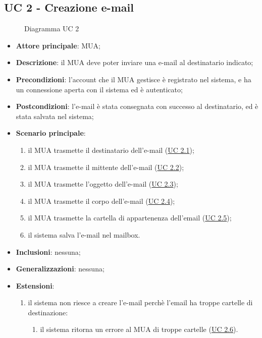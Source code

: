 
\subsection{UC 2 - Creazione e-mail} \label{sec:UC2}
    \begin{figure}[h]
        \centering
        \caption{Diagramma UC 2}
    \end{figure}
    \begin{itemize}
        \item \textbf{Attore principale}: MUA;
        \item \textbf{Descrizione}: il MUA deve poter inviare una e-mail al destinatario indicato;
        \item \textbf{Precondizioni}: l’account che il MUA gestisce è registrato nel sistema, e ha un connessione aperta con il sistema ed è autenticato;
        \item \textbf{Postcondizioni}: l'e-mail è stata consegnata con successo al destinatario, ed è stata salvata nel sistema;
        \item \textbf{Scenario principale}:
            \begin{enumerate}
                \item il MUA trasmette il destinatario dell'e-mail (\hyperref[sec:UC2.1]{UC 2.1});
                \item il MUA trasmette il mittente dell'e-mail (\hyperref[sec:UC2.2]{UC 2.2});
                \item il MUA trasmette l'oggetto dell'e-mail (\hyperref[sec:UC2.3]{UC 2.3});
                \item il MUA trasmette il corpo dell'e-mail (\hyperref[sec:UC2.4]{UC 2.4});
                \item il MUA trasmette la cartella di appartenenza dell'email (\hyperref[sec:UC2.5]{UC 2.5});
                \item il sistema salva l'e-mail nel mailbox.
            \end{enumerate}
        \item \textbf{Inclusioni}: nessuna;
        \item \textbf{Generalizzazioni}: nessuna;
        \item \textbf{Estensioni}: 
            \begin{enumerate}[label=\alph*.]
                \item il sistema non riesce a creare l'e-mail perchè l'email ha troppe cartelle di destinazione:
                \begin{enumerate}[label=\arabic*.]
                    \item il sistema ritorna un errore al MUA di troppe cartelle (\hyperref[sec:UC2.6]{UC 2.6}).
                \end{enumerate}
            \end{enumerate}
    \end{itemize}

